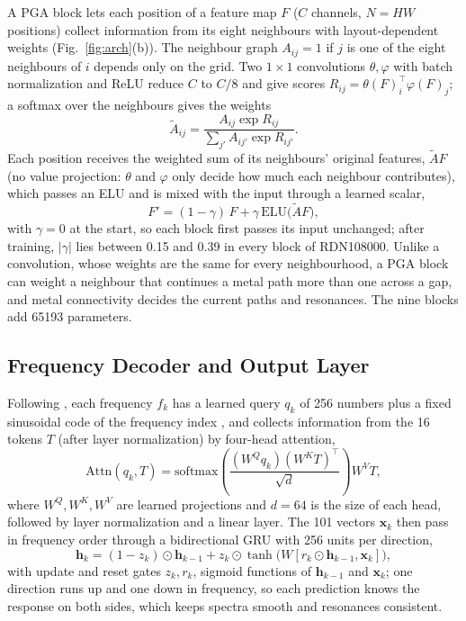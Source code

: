 \documentclass[journal]{IEEEtran}
\begin{document}
A PGA block \cite{pganet} lets each position of a feature map $F$ ($C$ channels, $N=HW$ positions) collect information from its eight neighbours with layout-dependent weights (Fig.~\ref{fig:arch}(b)). The neighbour graph $A_{ij}=1$ if $j$ is one of the eight neighbours of $i$ depends only on the grid. Two $1\times1$ convolutions $\theta,\varphi$ with batch normalization and ReLU reduce $C$ to $C/8$ and give scores $R_{ij}=\theta(F)_i^{\top}\varphi(F)_j$; a softmax over the neighbours gives the weights
\begin{equation}
\tilde{A}_{ij}=\frac{A_{ij}\exp R_{ij}}{\sum_{j'}A_{ij'}\exp R_{ij'}} .
\label{eq:masked}
\end{equation}
Each position receives the weighted sum of its neighbours' original features, $\tilde AF$ (no value projection: $\theta$ and $\varphi$ only decide how much each neighbour contributes), which passes an ELU and is mixed with the input through a learned scalar,
\begin{equation}
F' = (1-\gamma)\,F + \gamma\,\mathrm{ELU}\big(\tilde{A}F\big),
\label{eq:gate}
\end{equation}
with $\gamma=0$ at the start, so each block first passes its input unchanged; after training, $|\gamma|$ lies between 0.15 and 0.39 in every block of RDN108000. Unlike a convolution, whose weights are the same for every neighbourhood, a PGA block can weight a neighbour that continues a metal path more than one across a gap, and metal connectivity decides the current paths and resonances. The nine blocks add \num{65193} parameters.

\subsection{Frequency Decoder and Output Layer}
Following \cite{edgeaware}, each frequency $f_k$ has a learned query $q_k$ of 256 numbers plus a fixed sinusoidal code of the frequency index \cite{vaswani}, and collects information from the 16 tokens $T$ (after layer normalization) by four-head attention,
\begin{equation}
\mathrm{Attn}(q_k,T)=\mathrm{softmax}\!\left(\frac{(W^{Q}q_k)(W^{K}T)^{\top}}{\sqrt{d}}\right)W^{V}T,
\end{equation}
where $W^{Q},W^{K},W^{V}$ are learned projections and $d=64$ is the size of each head, followed by layer normalization and a linear layer. The 101 vectors $\mathbf x_k$ then pass in frequency order through a bidirectional GRU \cite{gru} with 256 units per direction,
\begin{equation}
\mathbf h_k=(1-z_k)\odot\mathbf h_{k-1}+z_k\odot\tanh\!\big(W[r_k\odot\mathbf h_{k-1},\mathbf x_k]\big),
\end{equation}
with update and reset gates $z_k,r_k$, sigmoid functions of $\mathbf h_{k-1}$ and $\mathbf x_k$; one direction runs up and one down in frequency, so each prediction knows the response on both sides, which keeps spectra smooth and resonances consistent.
\end{document}
